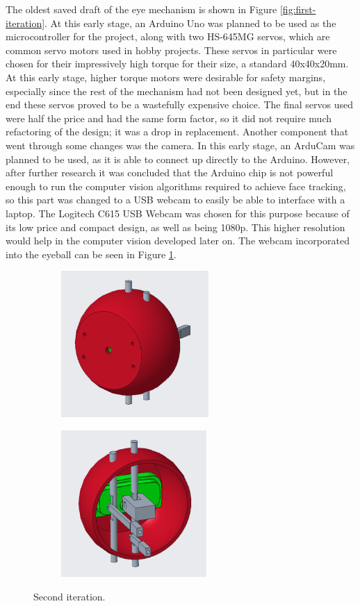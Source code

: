 The oldest saved draft of the eye mechanism is shown in Figure \ref{fig:first-iteration}. At this early stage, an Arduino Uno was planned to be used as the microcontroller for the project, along with two HS-645MG servos, which are common servo motors used in hobby projects. These servos in particular were chosen for their impressively high torque for their size, a standard 40x40x20mm. At this early stage, higher torque motors were desirable for safety margins, especially since the rest of the mechanism had not been designed yet, but in the end these servos proved to be a wastefully expensive choice. The final servos used were half the price and had the same form factor, so it did not require much refactoring of the design; it was a drop in replacement. Another component that went through some changes was the camera. In this early stage, an ArduCam was planned to be used, as it is able to connect up directly to the Arduino. However, after further research it was concluded that the Arduino chip is not powerful enough to run the computer vision algorithms required to achieve face tracking, so this part was changed to a USB webcam to easily be able to interface with a laptop. The Logitech C615 USB Webcam was chosen for this purpose because of its low price and compact design, as well as being 1080p. This higher resolution would help in the computer vision developed later on. The webcam incorporated into the eyeball can be seen in Figure \ref{fig:iteration2}.

\begin{figure}[h]
    \centering
    \begin{subfigure}{0.4\linewidth}
        \includegraphics[height=2.2in]{Thesis/ch2/iteration2.png}
    \end{subfigure}
    \begin{subfigure}{0.4\linewidth}
        \includegraphics[height=2.2in]{Thesis/ch2/iteration2-2.png}
    \end{subfigure}
    \caption{Second iteration.}
    \label{fig:iteration2}
\end{figure}

